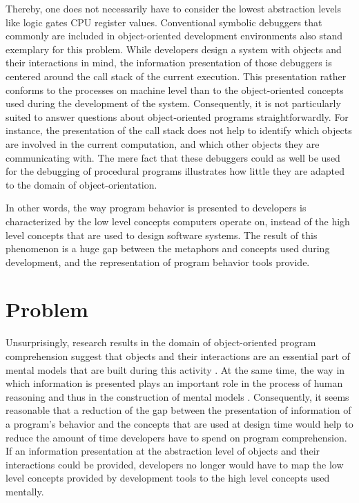 Thereby, one does not necessarily have to consider the lowest abstraction levels like logic gates CPU register values.
Conventional symbolic debuggers that commonly are included in object-oriented development environments also stand exemplary for this problem.
While developers design a system with objects and their interactions in mind, the information presentation of those debuggers is centered around the call stack of the current execution.
This presentation rather conforms to the processes on machine level than to the object-oriented concepts used during the development of the system.
Consequently, it is not particularly suited to answer questions about object-oriented programs straightforwardly.
For instance, the presentation of the call stack does not help to identify which objects are involved in the current computation, and which other objects they are communicating with.
The mere fact that these debuggers could as well be used for the debugging of procedural programs illustrates how little they are adapted to the domain of object-orientation.

In other words, the way program behavior is presented to developers is characterized by the low level concepts computers operate on, instead of the high level concepts that are used to design software systems.
The result of this phenomenon is a huge gap between the metaphors and concepts used during development, and the representation of program behavior tools provide.

\section{Problem}
Unsurprisingly, research results in the domain of object-oriented program comprehension suggest that objects and their interactions are an essential part of mental models that are built during this activity \cite{burkhardt_mental_1997}.
At the same time, the way in which information is presented plays an important role in the process of human reasoning and thus in the construction of mental models \cite{diehl_software_2007}.
Consequently, it seems reasonable that a reduction of the gap between the presentation of information of a program's behavior and the concepts that are used at design time would help to reduce the amount of time developers have to spend on program comprehension.
If an information presentation at the abstraction level of objects and their interactions could be provided, developers no longer would have to map the low level concepts provided by development tools to the high level concepts used mentally.

